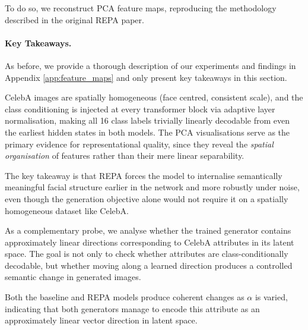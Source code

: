 To do so, we reconstruct PCA feature maps, reproducing the methodology described
in the original REPA paper.

\paragraph{Key Takeaways.} As before, we provide a thorough description of our
experiments and findings in Appendix \ref{app:feature_maps} and only present key takeaways in this section.

CelebA images are spatially homogeneous (face centred, consistent scale), and the
class conditioning is injected at every transformer block via adaptive layer
normalisation, making all 16 class labels trivially linearly decodable from
even the earliest hidden states in both models. The
PCA visualisations serve as the primary evidence for representational
quality, since they reveal the \emph{spatial organisation} of features rather
than their mere linear separability.

The key takeaway is that REPA forces the model to internalise
semantically meaningful facial structure earlier in the network and more
robustly under noise, even though the generation objective alone would not
require it on a spatially homogeneous dataset like CelebA.

As a complementary probe, we analyse whether the trained generator contains
approximately linear directions corresponding to CelebA attributes in its latent
space. The goal is not only to check whether attributes are class-conditionally
decodable, but whether moving along a learned direction produces a controlled
semantic change in generated images.

Both the baseline and REPA models produce coherent
changes as $\alpha$ is varied, indicating that both generators manage
to encode this attribute as an approximately linear vector direction in latent
space.
